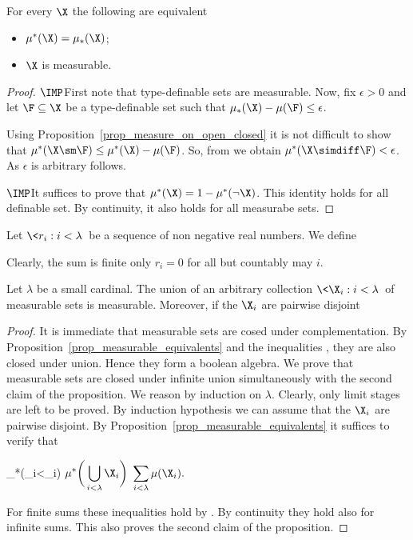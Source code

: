 \documentclass[creche.tex]{subfiles}
\begin{document}
\begin{proposition}\label{prop_measurable_equivalents}
For every $\X$ the following are equivalent
\begin{itemize}
\item[1.] $\mu^*(\X)=\mu_*(\X)$;
\item[2.] $\X$ is measurable.
\end{itemize}
\end{proposition}
\begin{proof}
$\IMP$\quad First note that type-definable sets are measurable.
Now, fix $\epsilon>0$ and let $\F\subseteq\X$ be a type-definable set such that $\mu_*(\X)-\mu(\F)\le\epsilon$.

Using Proposition~\ref{prop_measure_on_open_closed} it is not difficult to show that $\mu^*(\X\sm\F)\le\mu^*(\X)-\mu(\F)$.
So, from  we obtain  $\mu^*(\X\simdiff\F)<\epsilon$.
As $\epsilon$ is arbitrary  follows.

$\IMP$\quad It suffices to prove that $\mu^*(\X)=1-\mu^*(\neg\X)$.
This identity holds for all definable set.
By continuity, it also holds for all measurabe sets.
\end{proof}

Let $\<r_i : i<\lambda\>$ be a sequence of non negative real numbers. 
We define


Clearly, the sum is finite only $r_i=0$ for all but countably may $i$. 


\begin{proposition}
Let $\lambda$ be a small cardinal.
The union of an arbitrary collection $\<\X_i : i<\lambda\>$ of measurable sets is measurable. 
Moreover, if the $\X_i$ are pairwise disjoint

\end{proposition}

\begin{proof}
It is immediate that measurable sets are cosed under complementation.
By Proposition~\ref{prop_measurable_equivalents} and the inequalities \ssf{\#}, they are also closed under union.
Hence they form a boolean algebra.
We prove that measurable sets are closed under infinite union simultaneously with the second claim of the proposition.
We reason by induction on $\lambda$.
Clearly, only limit stages are left to be proved.
By induction hypothesis we can assume that the $\X_i$ are pairwise disjoint.
By Proposition~\ref{prop_measurable_equivalents} it suffices to verify that 

{\mu_*\bigg(\bigcup_{i<\lambda}\X_i\bigg)}
\medrel{\le}
$\displaystyle{\mu^*\bigg(\bigcup_{i<\lambda}\X_i\bigg)}$
\medrel{\le}
$\displaystyle{\sum_{i<\lambda}\mu(\X_i)}.$

For finite sums these inequalities hold by \ssf{\#}.
By continuity they hold also for infinite sums.
This also proves the second claim of the proposition.
\end{proof}
\end{document}
